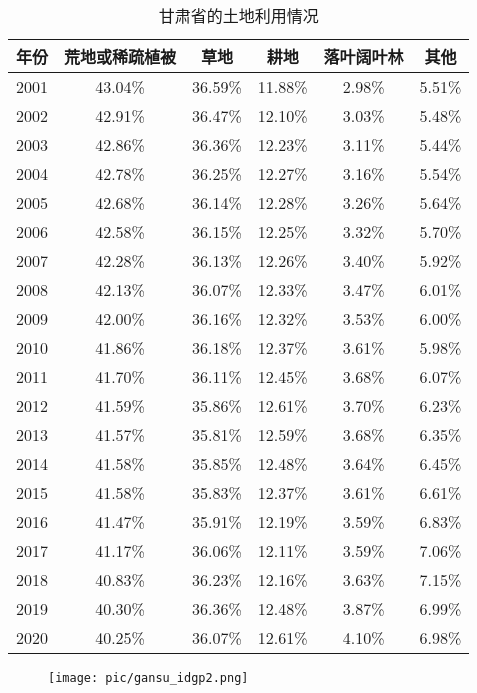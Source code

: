 \documentclass{article}
\begin{document}
		\begin{table}[H]
			\centering
			\begin{tabular}{|c|c|c|c|c|c|}
				\hline
				年份 & 荒地或稀疏植被 & 草地 & 耕地 & 落叶阔叶林 & 其他 \\
				\hline
				2001 & 43.04\% & 36.59\% & 11.88\% & 2.98\% & 5.51\% \\
				2002 & 42.91\% & 36.47\% & 12.10\% & 3.03\% & 5.48\% \\
				2003 & 42.86\% & 36.36\% & 12.23\% & 3.11\% & 5.44\% \\
				2004 & 42.78\% & 36.25\% & 12.27\% & 3.16\% & 5.54\% \\
				2005 & 42.68\% & 36.14\% & 12.28\% & 3.26\% & 5.64\% \\
				2006 & 42.58\% & 36.15\% & 12.25\% & 3.32\% & 5.70\% \\
				2007 & 42.28\% & 36.13\% & 12.26\% & 3.40\% & 5.92\% \\
				2008 & 42.13\% & 36.07\% & 12.33\% & 3.47\% & 6.01\% \\
				2009 & 42.00\% & 36.16\% & 12.32\% & 3.53\% & 6.00\% \\
				2010 & 41.86\% & 36.18\% & 12.37\% & 3.61\% & 5.98\% \\
				2011 & 41.70\% & 36.11\% & 12.45\% & 3.68\% & 6.07\% \\
				2012 & 41.59\% & 35.86\% & 12.61\% & 3.70\% & 6.23\% \\
				2013 & 41.57\% & 35.81\% & 12.59\% & 3.68\% & 6.35\% \\
				2014 & 41.58\% & 35.85\% & 12.48\% & 3.64\% & 6.45\% \\
				2015 & 41.58\% & 35.83\% & 12.37\% & 3.61\% & 6.61\% \\
				2016 & 41.47\% & 35.91\% & 12.19\% & 3.59\% & 6.83\% \\
				2017 & 41.17\% & 36.06\% & 12.11\% & 3.59\% & 7.06\% \\
				2018 & 40.83\% & 36.23\% & 12.16\% & 3.63\% & 7.15\% \\
				2019 & 40.30\% & 36.36\% & 12.48\% & 3.87\% & 6.99\% \\
				2020 & 40.25\% & 36.07\% & 12.61\% & 4.10\% & 6.98\% \\
				\hline
			\end{tabular}
			\caption{甘肃省的土地利用情况}
		\end{table}
	\begin{figure}[H]  %
			\centering
			\texttt{[image: pic/gansu\_idgp2.png]} %
		\end{figure}
		
\end{document}
